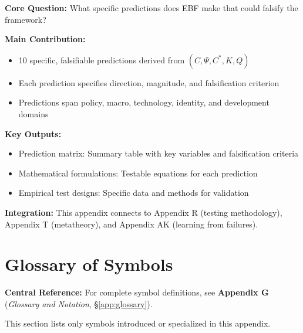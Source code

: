 \begin{tcolorbox}[colback=green!10!white, colframe=green!75!black,
    title=\textbf{Appendix S: Summary}]

\textbf{Core Question:} What specific predictions does EBF make that could falsify the framework?

\textbf{Main Contribution:}
\begin{itemize}[nosep]
    \item 10 specific, falsifiable predictions derived from $(C, \Psi, C^*, K, Q)$
    \item Each prediction specifies direction, magnitude, and falsification criterion
    \item Predictions span policy, macro, technology, identity, and development domains
\end{itemize}

\textbf{Key Outputs:}
\begin{itemize}[nosep]
    \item Prediction matrix: Summary table with key variables and falsification criteria
    \item Mathematical formulations: Testable equations for each prediction
    \item Empirical test designs: Specific data and methods for validation
\end{itemize}

\textbf{Integration:} This appendix connects to Appendix R (testing methodology), Appendix T (metatheory), and Appendix AK (learning from failures).

\end{tcolorbox}


\section{Glossary of Symbols}
\label{sec:S-glossary}

\begin{tcolorbox}[colback=blue!5!white, colframe=blue!75!black]
\textbf{Central Reference:} For complete symbol definitions, see
\textbf{Appendix G} (\textit{Glossary and Notation}, \S\ref{app:glossary}).

This section lists only symbols introduced or specialized in this appendix.
\end{tcolorbox}

\vspace{0.5em}

